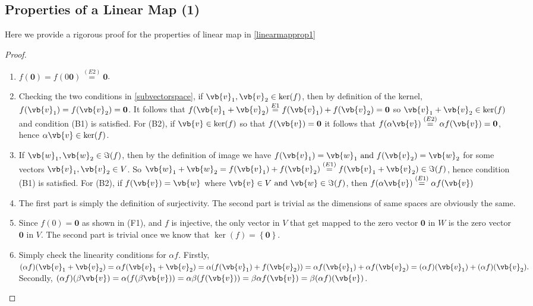 \documentclass[a4paper,12pt]{report}
\begin{document}
\begin{appendices}
\section{Properties of a Linear Map (1)} \label{linearmapprop1app}

Here we provide a rigorous proof for the properties of linear map in \cref{linearmapprop1}

\begin{proof}

\begin{enumerate}[label=(\(F\)\arabic*)]
    \item \(f(\boldsymbol{0}) = f(0 \boldsymbol{0} ) \stackrel{(E2)}{=} \boldsymbol{0}  \).
    \item Checking the two conditions in \cref{subvectorspace}, if \(\vb{v} _{1}, \vb{v} _{2} \in \ker (f)  \), then by definition of the kernel, \(f(\vb{v} _{1} ) = f(\vb{v} _{2} ) = \boldsymbol{0} \). It follows that \(f(\vb{v} _{1} + \vb{v} _{2}  ) \stackrel{E1}{=} f(\vb{v} _{1} ) + f(\vb{v} _{2} ) = \boldsymbol{0} \) so \(\vb{v} _{1} + \vb{v} _{2} \in \ker (f) \) and condition (B1) is satisfied. For (B2), if \(\vb{v} \in \ker (f)\) so that \(f(\vb{v} ) = \boldsymbol{0} \) it follows that \(f(\alpha \vb{v} ) \stackrel{(E2)}{=} \alpha f(\vb{v} ) = \boldsymbol{0}  \), hence \(\alpha \vb{v} \in \ker (f)\).         
    \item If \(\vb{w} _{1}, \vb{w} _{2} \in \Im (f)  \), then by the definition of image we have \(f(\vb{v} _{1} ) = \vb{w} _{1} \text { and } f(\vb{v} _{2} ) = \vb{w} _{2}   \) for some vectors \(\vb{v} _{1}, \vb{v} _{2} \in V  \). So \(\vb{w} _{1} + \vb{w} _{2} = f(\vb{v} _{1} ) + f(\vb{v} _{2} ) \stackrel{(E1)}{=}  f(\vb{v} _{1}+ \vb{v} _{2}   ) \in \Im (f)\), hence condition (B1) is satisfied. For (B2), if \(f(\vb{v} ) = \vb{w} \) where \(\vb{v}  \in  V \text { and } \vb{w} \in \Im (f)\), then \(f(\alpha \vb{v} ) \stackrel{(E1)}{=} \alpha f(\vb{v} ) \) 
    \item The first part is simply the definition of surjectivity. The second part is trivial as the dimensions of same spaces are obviously the same.
    \item Since \(f(0) = \boldsymbol{0} \) as shown in (F1), and \(f\) is injective, the only vector in \(V\) that get mapped to the zero vector \(\boldsymbol{0} \) in \(W\) is the zero vector \(\boldsymbol{0} \) in \(V\). The second part is trivial once we know that \(\ker (f) = \left\{ \boldsymbol{0}  \right\}\).
    \item Simply check the linearity conditions for \(\alpha f\). Firstly, \((\alpha f)(\vb{v} _{1} + \vb{v} _{2}  ) = \alpha f(\vb{v} _{1} + \vb{v} _{2}  ) = \alpha (f(\vb{v} _{1} ) + f(\vb{v} _{2} )) = \alpha f(\vb{v} _{1}) + \alpha f(\vb{v} _{2} ) = (\alpha f)(\vb{v} _{1} ) + (\alpha f)(\vb{v} _{2} ).\) Secondly, \((\alpha f)(\beta \vb{v} ) = \alpha (f(\beta \vb{v} )) = \alpha \beta (f(\vb{v} )) = \beta \alpha f(\vb{v} ) = \beta (\alpha f)(\vb{v} )\).

\end{enumerate}
\end{proof}
\end{appendices}
\end{document}
